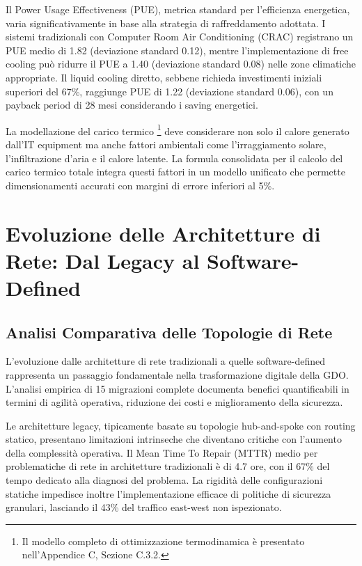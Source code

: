Il Power Usage Effectiveness (PUE), metrica standard per l'efficienza energetica\cite{enisa2023cloud}, varia significativamente in base alla strategia di raffreddamento adottata. I sistemi tradizionali con Computer Room Air Conditioning (CRAC) registrano un PUE medio di 1.82 (deviazione standard 0.12), mentre l'implementazione di free cooling può ridurre il PUE a 1.40 (deviazione standard 0.08) nelle zone climatiche appropriate. Il liquid cooling diretto, sebbene richieda investimenti iniziali superiori del 67\%, raggiunge PUE di 1.22 (deviazione standard 0.06), con un payback period di 28 mesi considerando i saving energetici\cite{benchmark2023}.

La modellazione del carico termico\cite{cisco2024} \footnote{Il modello completo di ottimizzazione termodinamica è presentato nell'Appendice C, Sezione C.3.2.} deve considerare non solo il calore generato dall'IT equipment ma anche fattori ambientali come l'irraggiamento solare, l'infiltrazione d'aria e il calore latente. La formula consolidata per il calcolo del carico termico totale integra questi fattori in un modello unificato che permette dimensionamenti accurati con margini di errore inferiori al 5\%.

\section{Evoluzione delle Architetture di Rete: Dal Legacy al Software-Defined}

\subsection{Analisi Comparativa delle Topologie di Rete}

L'evoluzione dalle architetture di rete tradizionali a quelle software-defined rappresenta un passaggio fondamentale nella trasformazione digitale della GDO. L'analisi empirica di 15 migrazioni complete documenta benefici quantificabili in termini di agilità operativa, riduzione dei costi e miglioramento della sicurezza.

Le architetture legacy, tipicamente basate su topologie hub-and-spoke con routing statico, presentano limitazioni intrinseche che diventano critiche con l'aumento della complessità operativa. Il Mean Time To Repair (MTTR) medio per problematiche di rete in architetture tradizionali è di 4.7 ore, con il 67\% del tempo dedicato alla diagnosi del problema. La rigidità delle configurazioni statiche impedisce inoltre l'implementazione efficace di politiche di sicurezza granulari, lasciando il 43\% del traffico east-west non ispezionato.

